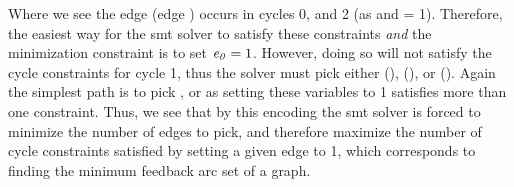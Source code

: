 Where we see the edge  (edge ) occurs in cycles 0, and 2
(as  and  = 1). Therefore, the easiest way for the
\ac{smt} solver to satisfy these constraints \emph{and} the minimization
constraint is to set $\mathit{e_{0}} = 1$. However, doing so will not satisfy the
cycle constraints for cycle 1, thus the solver must pick either 
(),  (), or  (). Again
the simplest path is to pick , or  as setting these
variables to 1 satisfies more than one constraint. Thus, we see that by this
encoding the \ac{smt} solver is forced to minimize the number of edges to pick,
and therefore maximize the number of cycle constraints satisfied by setting a
given edge to 1, which corresponds to finding the minimum feedback arc set of a
graph.

